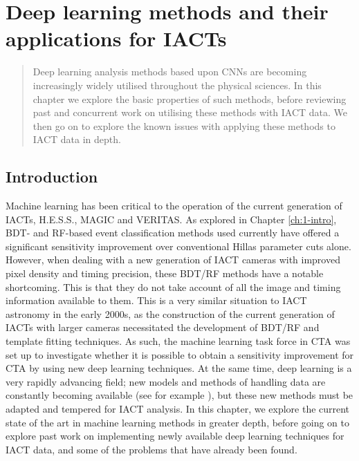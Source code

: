 \chapter{\label{ch:2-CNNs}Deep learning methods and their applications for IACTs}
\minitoc
\begin{abstract}
    Deep learning analysis methods based upon CNNs are becoming increasingly widely utilised throughout the physical sciences. In this chapter we explore the basic properties of such methods, before reviewing past and concurrent work on utilising these methods with IACT data. We then go on to explore the known issues with applying these methods to IACT data in depth.
\end{abstract}

\section{Introduction}

Machine learning has been critical to the operation of the current generation of IACTs, H.E.S.S., MAGIC and VERITAS. As explored in Chapter \ref{ch:1-intro}, BDT- and RF-based event classification methods used currently have offered a significant sensitivity improvement over conventional Hillas parameter cuts alone. However, when dealing with a new generation of IACT cameras with improved pixel density and timing precision, these BDT/RF methods have a notable shortcoming. This is that they do not take account of all the image and timing information available to them. This is a very similar situation to IACT astronomy in the early 2000s, as the construction of the current generation of IACTs with larger cameras necessitated the development of BDT/RF and template fitting techniques. As such, the machine learning task force in CTA was set up to investigate whether it is possible to obtain a sensitivity improvement for CTA by using new deep learning techniques. At the same time, deep learning is a very rapidly advancing field; new models and methods of handling data are constantly becoming available (see for example \cite{adithesis,chebnet}), but these new methods must be adapted and tempered for IACT analysis. In this chapter, we explore the current state of the art in machine learning methods in greater depth, before going on to explore past work on implementing newly available deep learning techniques for IACT data, and some of the problems that have already been found. 

